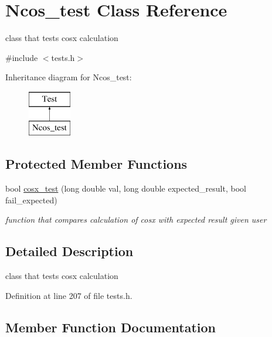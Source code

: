 \hypertarget{class_ncos__test}{}\section{Ncos\+\_\+test Class Reference}
\label{class_ncos__test}


class that tests cosx calculation  




{\ttfamily \#include $<$tests.\+h$>$}

Inheritance diagram for Ncos\+\_\+test\+:\begin{figure}[H]
\begin{center}
\leavevmode
\includegraphics[height=2.000000cm]{class_ncos__test}
\end{center}
\end{figure}
\subsection*{Protected Member Functions}
\begin{DoxyCompactItemize}
\item 
bool \mbox{\hyperlink{class_ncos__test_a8cc800b62ffc9a3d7de090899dfb856e}{cosx\+\_\+test}} (long double val, long double expected\+\_\+result, bool fail\+\_\+expected)
\begin{DoxyCompactList}\small\item\em function that compares calculation of cosx with expected result given user \end{DoxyCompactList}\end{DoxyCompactItemize}


\subsection{Detailed Description}
class that tests cosx calculation 

Definition at line 207 of file tests.\+h.



\subsection{Member Function Documentation}
\mbox{\label{class_ncos__test_a8cc800b62ffc9a3d7de090899dfb856e}} 
